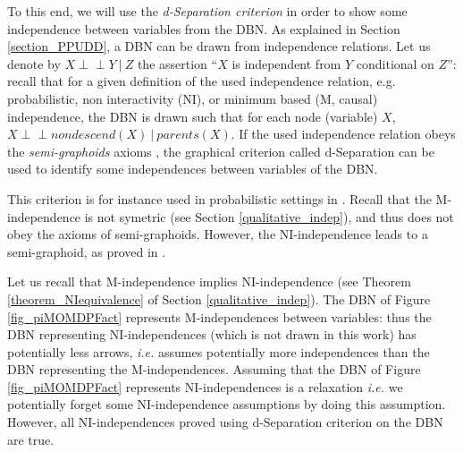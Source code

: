 To this end, we will use the \textit{d-Separation criterion} \cite{pearl88} 
in order to show some independence between variables from the DBN.
As explained in Section \ref{section_PPUDD}, 
a DBN can be drawn from independence relations.
Let us denote by $X \perp\!\!\!\perp Y \ \vert \ Z$
the assertion ``$X$ is independent from $Y$ conditional on $Z$'':
recall that for a given definition of the used independence relation,
e.g. probabilistic, non interactivity (NI), or minimum based (M, causal) independence,
the DBN is drawn such that for each node (variable) $X$,
$X \perp\!\!\!\perp nondescend(X) \ \vert \ parents(X)$.
If the used independence relation obeys the \textit{semi-graphoids} axioms \cite{Pearl:1988:PRI:52121,DBLP:journals/corr/abs-1304-2379},
the graphical criterion called d-Separation 
can be used to identify some independences between variables of the DBN.

This criterion is for instance used in probabilistic settings in \cite{Witwicki13icaps}.
Recall that the M-independence is not symetric (see Section \ref{qualitative_indep}),
and thus does not obey the axioms of semi-graphoids.
However, the NI-independence leads to a semi-graphoid,
as proved in \cite{delafonk}.

Let us recall that M-independence implies NI-independence
(see Theorem \ref{theorem_NIequivalence} of Section \ref{qualitative_indep}).
The DBN of Figure \ref{fig_piMOMDPFact}
represents M-independences between variables:
thus the DBN representing NI-independences (which is not drawn in this work) 
has potentially less arrows,
\textit{i.e.} assumes potentially more independences 
than the DBN representing the M-independences.
Assuming that the DBN of Figure \ref{fig_piMOMDPFact} 
represents NI-independences is a relaxation
\textit{i.e.} we potentially forget some NI-independence assumptions
by doing this assumption.
However, all NI-independences proved using d-Separation criterion
on the DBN are true.

